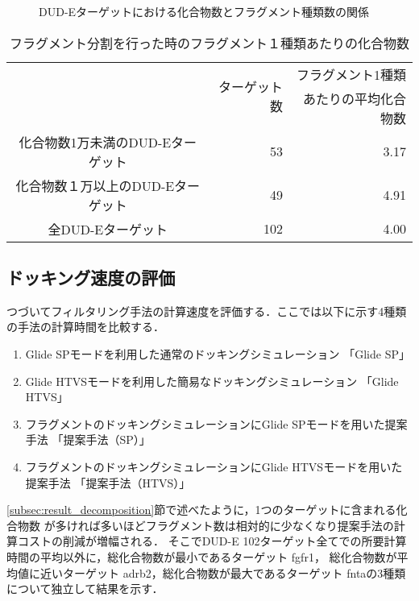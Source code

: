 \begin{figure}[bhtp]
 \begin{center}
	\vspace{-0.5cm}
  \caption{DUD-Eターゲットにおける化合物数とフラグメント種類数の関係}
  \label{fig:dude_decomposition}
 \end{center}
\end{figure}
\begin{table}[htb] \centering
	\caption{フラグメント分割を行った時のフラグメント１種類あたりの化合物数}
	\label{table:dude_decomposition}
	\begin{tabular}{c|rr}
	\hline
								&\multirow{2}{*}{ターゲット数}	&フラグメント1種類			\\
								&						&あたりの平均化合物数		\\ 
	\hline
	化合物数1万未満のDUD-Eターゲット		&53			&3.17							\\
	化合物数１万以上のDUD-Eターゲット		&49			&4.91							\\ 
	\hline
	全DUD-Eターゲット						&102		&4.00							\\ 
	\hline
	\end{tabular}
\end{table}


\subsection{ドッキング速度の評価}\label{subsec:single_calc_time}
つづいてフィルタリング手法の計算速度を評価する．ここでは以下に示す4種類の手法の計算時間を比較する．
\begin{enumerate}
\item Glide SPモードを利用した通常のドッキングシミュレーション 「Glide SP」
\item Glide HTVSモードを利用した簡易なドッキングシミュレーション 「Glide HTVS」
\item フラグメントのドッキングシミュレーションにGlide SPモードを用いた提案手法 「提案手法（SP）」
\item フラグメントのドッキングシミュレーションにGlide HTVSモードを用いた提案手法 「提案手法（HTVS）」
\end{enumerate}

\ref{subsec:result_decomposition}節で述べたように，1つのターゲットに含まれる化合物数
が多ければ多いほどフラグメント数は相対的に少なくなり提案手法の計算コストの削減が増幅される．
そこでDUD-E 102ターゲット全てでの所要計算時間の平均以外に，総化合物数が最小であるターゲット fgfr1，
総化合物数が平均値に近いターゲット adrb2，総化合物数が最大であるターゲット fntaの3種類について独立して結果を示す．

